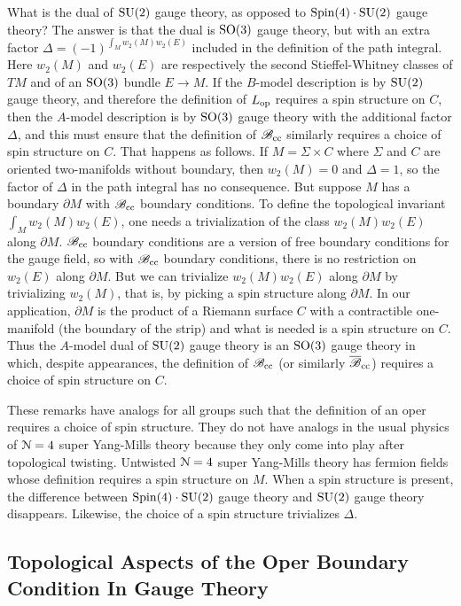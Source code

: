 \documentclass[11pt,a4paper]{article}
\begin{document}
What is the dual of ${\mathrm{SU}}(2)$ gauge theory, as opposed to ${\mathrm{Spin}}(4)\cdot {\mathrm{SU}}(2)$ gauge theory?
 The answer \cite{FG} is that the dual is ${\mathrm{SO}}(3)$ gauge theory, but with an extra factor $\Delta=(-1)^{\int_M w_2(M) w_2(E)}$ included in the definition of the path
 integral.   Here $w_2(M)$ and $w_2(E)$ are respectively the second Stieffel-Whitney classes of $TM$ and of an ${\mathrm{SO}}(3)$ bundle $E\to M$.
 If the $B$-model description is by ${\mathrm{SU}}(2)$ gauge theory, and therefore the definition of $L_{\mathrm{op}}$ requires a spin structure on $C$, then the $A$-model
 description is by ${\mathrm{SO}}(3)$ gauge theory with the additional factor $\Delta$, and this must ensure that the definition of ${\mathscr B}_{\mathrm{cc}}$ similarly requires a choice of
 spin structure on $C$.   That happens as follows.
 If $M=\Sigma\times C$ where $\Sigma$ and $C$ are oriented two-manifolds without boundary, then $w_2(M)=0$ and $\Delta=1$, so the factor of $\Delta$ in
 the path integral
 has no consequence.   But suppose $M$ has a boundary $\partial M$ with ${\mathscr B}_{\mathrm{cc}}$ boundary conditions.   To define the topological invariant $\int_M w_2(M) w_2(E)$,
 one needs a trivialization of the class $w_2(M) w_2(E)$ along $\partial M$.   ${\mathscr B}_{\mathrm{cc}}$ boundary conditions are a version of free boundary conditions 
 for the gauge field, so with ${\mathscr B}_{\mathrm{cc}}$ boundary conditions, there is no restriction on $w_2(E)$ along $\partial M$.  But we can trivialize $w_2(M)w_2(E)$ 
 along $\partial M$ by trivializing $w_2(M)$, that is, by picking a spin structure along $\partial M$.    In our application, $\partial M$ is the product of a Riemann
 surface $C$ with a contractible one-manifold (the boundary of the strip) and what is needed is a spin structure on $C$.    Thus the $A$-model
 dual of ${\mathrm{SU}}(2)$ gauge theory  is an ${\mathrm{SO}}(3)$ gauge theory in which, despite appearances, the definition of ${\mathscr B}_{\mathrm{cc}}$ (or similarly $\overline{{\mathscr B}}_{\mathrm{cc}}$) requires a choice of spin structure on $C$.

 
 These remarks
 have analogs for all groups  such that the definition of an oper requires a choice of spin structure.   
They do not have analogs  in the usual physics of ${\mathcal N}=4$ super Yang-Mills theory because they only come into play after topological twisting.   Untwisted
 ${\mathcal N}=4$ super Yang-Mills theory has fermion fields whose definition requires a spin structure on $M$.  When a spin structure is present, the difference between
 ${\mathrm{Spin}}(4)\cdot {\mathrm{SU}}(2)$ gauge theory and ${\mathrm{SU}}(2)$ gauge theory disappears. Likewise, the choice of a spin structure  trivializes $\Delta$.  
 
 \subsection{Topological Aspects of the Oper Boundary Condition In Gauge Theory}\label{opergauge}
 
\end{document}
